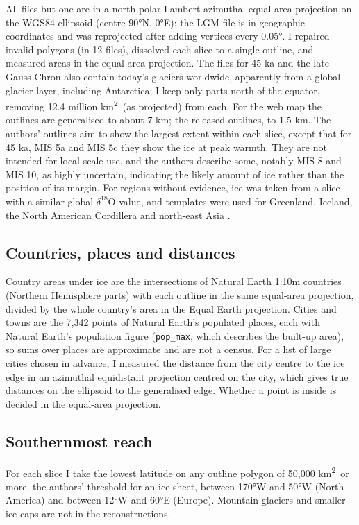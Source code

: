 \documentclass[11pt,a4paper]{article}
\newcommand{\kmq}{km\textsuperscript{2}}
\begin{document}
All files but one are in a north polar Lambert azimuthal equal-area projection on the WGS84 ellipsoid (centre 90°N, 0°E); the LGM file is in geographic coordinates and was reprojected after adding vertices every 0.05°. I repaired invalid polygons (in 12 files), dissolved each slice to a single outline, and measured areas in the equal-area projection. The files for 45 ka and the late Gauss Chron also contain today's glaciers worldwide, apparently from a global glacier layer, including Antarctica; I keep only parts north of the equator, removing 12.4 million \kmq\ (as projected) from each. For the web map the outlines are generalised to about 7 km; the released outlines, to 1.5 km. The authors' outlines aim to show the largest extent within each slice, except that for 45 ka, MIS 5a and MIS 5c they show the ice at peak warmth. They are not intended for local-scale use, and the authors describe some, notably MIS 8 and MIS 10, as highly uncertain, indicating the likely amount of ice rather than the position of its margin. For regions without evidence, ice was taken from a slice with a similar global $\delta^{18}$O value, and templates were used for Greenland, Iceland, the North American Cordillera and north-east Asia \citep{batchelor}.

\subsection{Countries, places and distances}
Country areas under ice are the intersections of Natural Earth 1:10m countries (Northern Hemisphere parts) with each outline in the same equal-area projection, divided by the whole country's area in the Equal Earth projection. Cities and towns are the 7,342 points of Natural Earth's populated places, each with Natural Earth's population figure (\texttt{pop\_max}, which describes the built-up area), so sums over places are approximate and are not a census. For a list of large cities chosen in advance, I measured the distance from the city centre to the ice edge in an azimuthal equidistant projection centred on the city, which gives true distances on the ellipsoid to the generalised edge. Whether a point is inside is decided in the equal-area projection.

\subsection{Southernmost reach}
For each slice I take the lowest latitude on any outline polygon of 50,000 \kmq\ or more, the authors' threshold for an ice sheet, between 170°W and 50°W (North America) and between 12°W and 60°E (Europe). Mountain glaciers and smaller ice caps are not in the reconstructions.
\end{document}
